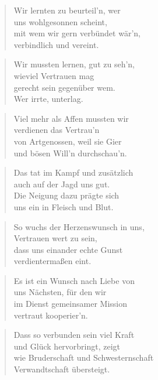 \documentclass[10pt,a4paper]{article}
\begin{document}
\begin{paracol}{2}
\begin{verse}
Wir lernten zu beurteil’n, wer \\
uns wohlgesonnen scheint, \\
mit wem wir gern verbündet wär’n, \\
verbindlich und vereint. \\
\end{verse}

\begin{verse}
Wir mussten lernen, gut zu seh’n, \\
wieviel Vertrauen mag \\
gerecht sein gegenüber wem. \\
Wer irrte, unterlag. \\
\end{verse}

\begin{verse}
Viel mehr als Affen mussten wir \\
verdienen das Vertrau’n \\
von Artgenossen, weil sie Gier \\
und bösen Will’n durchschau’n. \\
\end{verse}

\begin{verse}
Das tat im Kampf und zusätzlich \\
auch auf der Jagd uns gut. \\
Die Neigung dazu prägte sich \\
uns ein in Fleisch und Blut. \\
\end{verse}

\begin{verse}
So wuchs der Herzenswunsch in uns, \\
Vertrauen wert zu sein, \\
dass uns einander echte Gunst \\
verdientermaßen eint. \\
\end{verse}

\begin{verse}
Es ist ein Wunsch nach Liebe von \\
uns Nächsten, für den wir \\
im Dienst gemeinsamer Mission \\
vertraut kooperier’n. \\
\end{verse}

\begin{verse}
Dass so verbunden sein viel Kraft \\
und Glück hervorbringt, zeigt \\
wie Bruderschaft und Schwesternschaft \\
Verwandtschaft übersteigt. \\
\end{verse}


\end{paracol}
\end{document}
